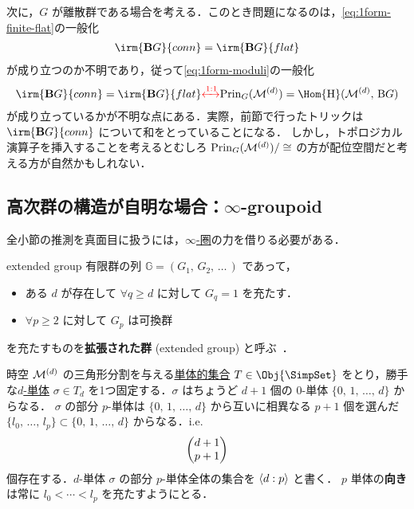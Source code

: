 \documentclass[TQFT_main]{subfiles}
\begin{document}
次に，$G$ が離散群である場合を考える．このとき問題になるのは，\eqref{eq:1form-finite-flat}の一般化
\begin{align}
    \irm{\bm{\mathrm{B}}G}{conn} = \irm{\bm{\mathrm{B}}G}{flat} 
\end{align}
が成り立つのか不明であり，従って\eqref{eq:1form-moduli}の一般化
\begin{align}
    \irm{\bm{\mathrm{B}}G}{conn} = \irm{\bm{\mathrm{B}}G}{flat} \textcolor{red}{\xleftrightarrow{1:1}} \mathrm{Prin}_G (\mfdcal{M}{d}) = \Hom{\mathrm{\bm{H}}} (\mfdcal{M}{d},\, \mathrm{\bm{B}}G)
\end{align}
が成り立っているかが不明な点にある．実際，前節で行ったトリックは $\irm{\bm{\mathrm{B}}G}{conn}$ について和をとっていることになる．
しかし，トポロジカル演算子を挿入することを考えるとむしろ $\mathrm{Prin}_G (\mathcal{M}^{(d)})/\cong$ の方が配位空間だと考える方が自然かもしれない．

\subsection{高次群の構造が自明な場合：$\infty$-groupoid}

全小節の推測を真面目に扱うには，\hyperref[def:infinity-1]{$\infty$-圏}の力を借りる必要がある．

\begin{mydef}[label=def:extGrp]{extended group}
    有限群の列 $\mathbb{G} = (G_1,\, G_2,\, \dots \,)$ であって，
    \begin{itemize}
        \item ある $d$ が存在して $\forall q \ge d$ に対して $G_q = 1$ を充たす．
        \item $\forall p \ge 2$ に対して $G_p$ は可換群
    \end{itemize}
    を充たすものを\textbf{拡張された群} (extended group) と呼ぶ~\cite{SChen2024anomaly}．
\end{mydef}

時空 $\mathcal{M}^{(d)}$ の三角形分割を与える\hyperref[def:SimpSet]{単体的集合} $T \in \Obj{\SimpSet}$ をとり，勝手な\hyperref[def:SimpSet]{$d$-単体} $\sigma \in T_d$ を1つ固定する．$\sigma$ はちょうど $d+1$ 個の $0$-単体 $\{0,\, 1,\, \dots,\, d\}$ からなる．
$\sigma$ の部分 $p$-単体は $\{0,\, 1,\, \dots,\, d\}$ から互いに相異なる $p+1$ 個を選んだ $\{l_0,\, \dots,\, l_p\} \subset \{0,\, 1,\, \dots,\, d\}$ からなる．i.e.
\begin{align}
    \mqty(d+1 \\  p+1)
\end{align}
個存在する．$d$-単体 $\sigma$ の部分 $p$-単体全体の集合を $\expval{d:p}$ と書く．
$p$ 単体の\textbf{向き}は常に $l_0 < \cdots < l_p$ を充たすようにとる．
\end{document}
